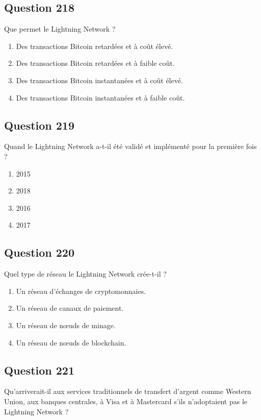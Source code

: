 \documentclass[12pt,a4paper]{article}
\begin{document}
\bigskip


\subsection*{Question 218}
Que permet le Lightning Network ?

\begin{enumerate}[label=\Alph*., leftmargin=*]
\item Des transactions Bitcoin retardées et à coût élevé.
\item Des transactions Bitcoin retardées et à faible coût.
\item Des transactions Bitcoin instantanées et à coût élevé.
\item Des transactions Bitcoin instantanées et à faible coût.
\end{enumerate}

\bigskip


\subsection*{Question 219}
Quand le Lightning Network a-t-il été validé et implémenté pour la première fois ?

\begin{enumerate}[label=\Alph*., leftmargin=*]
\item 2015
\item 2018
\item 2016
\item 2017
\end{enumerate}

\bigskip


\subsection*{Question 220}
Quel type de réseau le Lightning Network crée-t-il ?

\begin{enumerate}[label=\Alph*., leftmargin=*]
\item Un réseau d'échanges de cryptomonnaies.
\item Un réseau de canaux de paiement.
\item Un réseau de nœuds de minage.
\item Un réseau de nœuds de blockchain.
\end{enumerate}

\bigskip


\subsection*{Question 221}
Qu'arriverait-il aux services traditionnels de transfert d'argent comme Western Union, aux banques centrales, à Visa et à Mastercard s'ils n'adoptaient pas le Lightning Network ?
\end{document}
